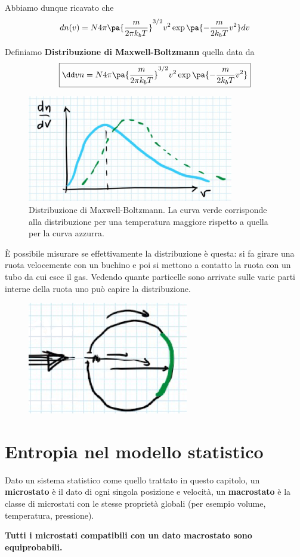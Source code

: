 \noindent
Abbiamo dunque ricavato che
\[dn(v)=N 4\pi\pa{\frac{m}{2\pi k_b T}}^{3/2}v^2\exp\pa{-\frac m{2k_bT}v^2}dv\]

\begin{definition}
Definiamo \textbf{Distribuzione di Maxwell-Boltzmann} quella data da
\[\boxed{\dd vn=N 4\pi\pa{\frac{m}{2\pi k_b T}}^{3/2}v^2\exp\pa{-\frac m{2k_bT}v^2}}\]
\begin{figure}[!htb]
    \centering
    \includegraphics[width=9cm]{images/Distribuzione_Maxwell_Boltzmann.png}
    \caption{Distribuzione di Maxwell-Boltzmann. La curva verde corrisponde alla distribuzione per una temperatura maggiore rispetto a quella per la curva azzurra.}
\end{figure}
\end{definition}
\noindent
\`E possibile misurare se effettivamente la distribuzione \`e questa:
si fa girare una ruota velocemente con un buchino e poi si mettono a contatto la ruota con un tubo da cui esce il gas. Vedendo quante particelle sono arrivate sulle varie parti interne della ruota uno pu\`o capire la distribuzione.

\begin{figure}[!htb]
    \centering
    \includegraphics[width=7cm]{images/Misura_distribuzione_Maxwell_Boltzmann.png}
\end{figure}


\section{Entropia nel modello statistico}
\begin{definition}
Dato un sistema statistico come quello trattato in questo capitolo, un \textbf{microstato} \`e il dato di ogni singola posizione e velocit\`a, un \textbf{macrostato} \`e la classe di microstati con le stesse propriet\`a globali (per esempio volume, temperatura, pressione).
\end{definition}
\begin{fact}
\textbf{Tutti i microstati compatibili con un dato macrostato sono equiprobabili.}
\end{fact}

